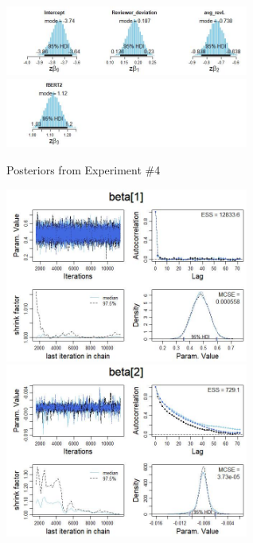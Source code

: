 \documentclass[man, floatsintext, 10pt]{apa6}
\begin{document}
\begin{figure}
\includegraphics[width=8cm]{posteriors_bdata_03.jpg}
\includegraphics[width=8cm]{pposteriors_bdata_03.jpg}
\caption{Posteriors from Experiment \#4}
\label{Exp4}
\end{figure}

\begin{figure}
\includegraphics[width=8cm]{experiment_5_1.jpg}
\includegraphics[width=8cm]{experiment_5_2.jpg} \\


\end{figure}
\end{document}
